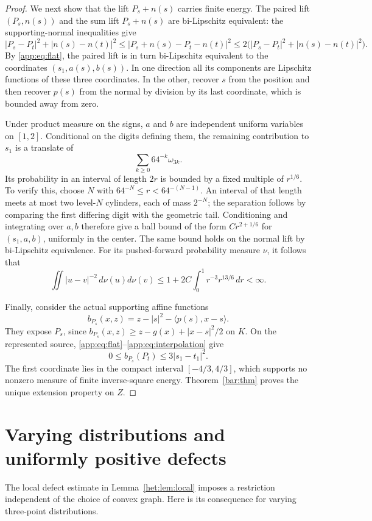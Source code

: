 \documentclass[11pt,letterpaper]{amsart}
\theoremstyle{definition}
\theoremstyle{remark}
\numberwithin{equation}{section}
\begin{document}
\begin{proof}
We next show that the lift $P_s+n(s)$ carries finite energy. The paired
lift $(P_s,n(s))$ and the sum lift $P_s+n(s)$ are bi-Lipschitz equivalent:
the supporting-normal inequalities give
\[
 |P_s-P_t|^2+|n(s)-n(t)|^2
 \le |P_s+n(s)-P_t-n(t)|^2
 \le2\bigl(|P_s-P_t|^2+|n(s)-n(t)|^2\bigr).
\]
By \eqref{app:eq:flat}, the paired lift is in turn bi-Lipschitz equivalent
to the coordinates $(s_1,a(s),b(s))$. In one direction all its components
are Lipschitz functions of these three coordinates. In the other,
recover $s$ from the position and then recover $p(s)$ from the normal
by division by its last coordinate, which is bounded away from zero.

Under product measure on the signs, $a$ and $b$ are independent uniform
variables on $[1,2]$. Conditional on the digits defining them, the
remaining contribution to $s_1$ is a translate of
\[
                         \sum_{k\ge0}64^{-k}\omega_{3k}.
\]
Its probability in an interval of length $2r$ is bounded by a fixed
multiple of $r^{1/6}$. To verify this, choose $N$ with
$64^{-N}\le r<64^{-(N-1)}$. An interval of that length meets at most
two level-$N$ cylinders, each of mass $2^{-N}$; the separation follows
by comparing the first differing digit with the geometric tail.
Conditioning and integrating over $a,b$ therefore give a ball bound
of the form $Cr^{2+1/6}$ for $(s_1,a,b)$, uniformly in the center.
The same bound holds on the normal lift by bi-Lipschitz equivalence.
For its pushed-forward probability measure $\nu$, it follows that
\[
 \iint |u-v|^{-2}\,d\nu(u)d\nu(v)
 \le1+2C\int_0^1r^{-3}r^{13/6}\,dr<\infty.
\]

Finally, consider the actual supporting affine functions
\[
 b_{P_s}(x,z)=z-|s|^2-\langle p(s),x-s\rangle.
\]
They expose $P_s$, since
$b_{P_s}(x,z)\ge z-g(x)+|x-s|^2/2$ on $K$. On the represented source,
\eqref{app:eq:flat}--\eqref{app:eq:interpolation} give
\[
                  0\le b_{P_s}(P_t)\le3|s_1-t_1|^2.
\]
The first coordinate lies in the compact interval $[-4/3,4/3]$,
which supports no nonzero measure of finite inverse-square energy.
Theorem~\ref{bar:thm} proves the unique extension property on $Z$.
\end{proof}

\section{Varying distributions and uniformly positive defects}
\label{app:heterogeneous}

The local defect estimate in Lemma~\ref{het:lem:local} imposes a
restriction independent of the choice of convex graph. Here is its
consequence for varying three-point distributions.
\end{document}
